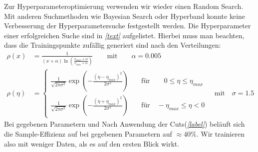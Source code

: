 Zur Hyperparameteroptimierung verwenden wir wieder einen Random Search. Mit anderen Suchmethoden wie Bayesian Search oder Hyperband konnte keine Verbesserung der Hyperparametersuche festgestellt werden. Die Hyperparameter einer erfolgreichen Suche sind in \textit{\autoref{text}} aufgelistet. Hierbei muss man beachten, dass die Trainingspunkte zufällig generiert sind nach den Verteilungen:
\begin{equation}
\begin{aligned}
\rho(x) &= \frac{1}{(x + \alpha)\ln(\frac{x_{max} + \alpha}{x_{min}+ \alpha})} \qquad \text{mit} \qquad \alpha = 0.005 \\
\rho(\eta) &= \begin{cases}
\frac{1}{\sqrt{2\pi \sigma^2}} \exp(-\frac{(\eta - \eta_{max})^2}{2\sigma^2}) \quad & \text{für} \qquad 0 \leq \eta \leq \eta_{max}\\
\frac{1}{\sqrt{2\pi \sigma^2}} \exp(-\frac{(\eta + \eta_{max})^2}{2\sigma^2}) \quad & \text{für} \quad -\eta_{max} \leq \eta < 0
\end{cases} \quad \text{mit} \quad \sigma = 1.5
\end{aligned}
\end{equation}
Bei gegebenen Parametern und Nach Anwendung der Cuts(\textit{\autoref{label}}) beläuft sich die Sample-Effizienz auf bei gegebenen Parametern auf $\approx 40\%$. Wir trainieren also mit weniger Daten, als es auf den ersten Blick wirkt. \\
